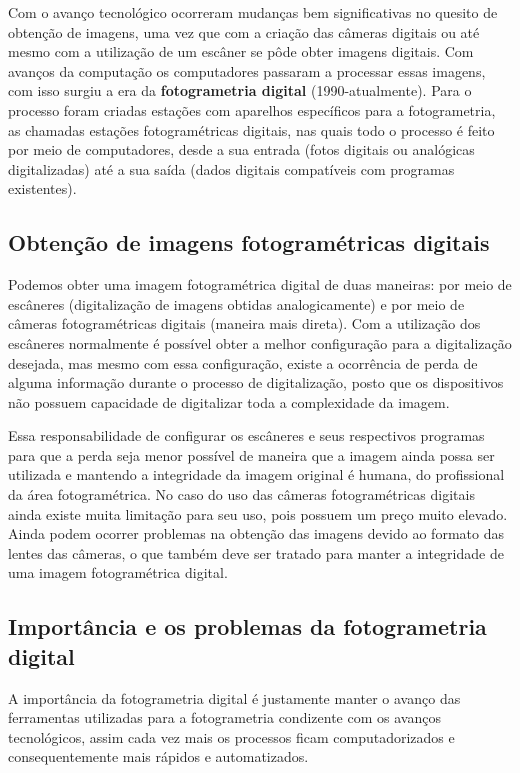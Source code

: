 Com o avanço tecnológico ocorreram mudanças bem significativas no quesito de obtenção de imagens, uma vez que com a criação das câmeras digitais ou até mesmo com a utilização de um escâner se pôde obter imagens digitais. Com avanços da computação os computadores passaram a processar essas imagens, com isso surgiu a era da \textbf{fotogrametria digital} (1990-atualmente). Para o processo foram criadas estações com aparelhos específicos para a fotogrametria, as chamadas estações fotogramétricas digitais, nas quais todo o processo é feito por meio de computadores, desde a sua entrada (fotos digitais ou analógicas digitalizadas) até a sua saída (dados digitais compatíveis com programas existentes).

\subsection{Obtenção de imagens fotogramétricas digitais}
Podemos obter uma imagem fotogramétrica digital de duas maneiras: por meio de escâneres (digitalização de imagens obtidas analogicamente) e por meio de câmeras fotogramétricas digitais (maneira mais direta). Com a utilização dos escâneres normalmente é possível obter a melhor configuração para a digitalização desejada, mas mesmo com essa configuração, existe a ocorrência de perda de alguma informação durante o processo de digitalização, posto que os dispositivos não possuem capacidade de digitalizar toda a complexidade da imagem. %

Essa responsabilidade de configurar os escâneres e seus respectivos programas para que a perda seja menor possível de maneira que a imagem ainda possa ser utilizada e mantendo a integridade da imagem original é humana, do profissional da área fotogramétrica. No caso do uso das câmeras fotogramétricas digitais ainda existe muita limitação para seu uso, pois possuem um preço muito elevado. %
Ainda podem ocorrer problemas na obtenção das imagens devido ao formato das lentes das câmeras, o que também deve ser tratado para manter a integridade de uma imagem fotogramétrica digital.

\subsection{Importância e os problemas da fotogrametria digital}
A importância da fotogrametria digital é justamente manter o avanço das ferramentas utilizadas para a fotogrametria condizente com os avanços tecnológicos, assim cada vez mais os processos ficam computadorizados e consequentemente mais rápidos e automatizados.

